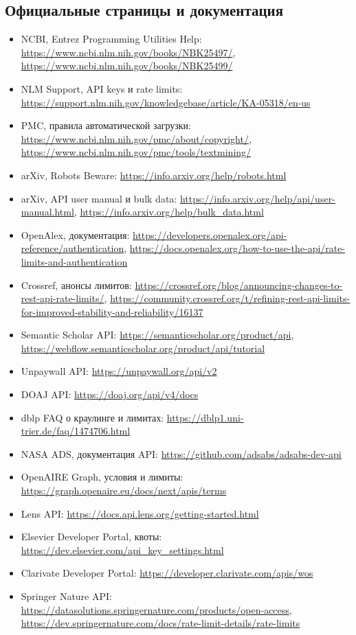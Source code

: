 \documentclass[11pt,a4paper]{article}
\begin{document}
\subsection*{Официальные страницы и документация}
\begin{itemize}[leftmargin=1.2em]
  \item NCBI, Entrez Programming Utilities Help: \url{https://www.ncbi.nlm.nih.gov/books/NBK25497/}, \url{https://www.ncbi.nlm.nih.gov/books/NBK25499/}
  \item NLM Support, API keys и rate limits: \url{https://support.nlm.nih.gov/knowledgebase/article/KA-05318/en-us}
  \item PMC, правила автоматической загрузки: \url{https://www.ncbi.nlm.nih.gov/pmc/about/copyright/}, \url{https://www.ncbi.nlm.nih.gov/pmc/tools/textmining/}
  \item arXiv, Robots Beware: \url{https://info.arxiv.org/help/robots.html}
  \item arXiv, API user manual и bulk data: \url{https://info.arxiv.org/help/api/user-manual.html}, \url{https://info.arxiv.org/help/bulk_data.html}
  \item OpenAlex, документация: \url{https://developers.openalex.org/api-reference/authentication}, \url{https://docs.openalex.org/how-to-use-the-api/rate-limits-and-authentication}
  \item Crossref, анонсы лимитов: \url{https://crossref.org/blog/announcing-changes-to-rest-api-rate-limits/}, \url{https://community.crossref.org/t/refining-rest-api-limits-for-improved-stability-and-reliability/16137}
  \item Semantic Scholar API: \url{https://semanticscholar.org/product/api}, \url{https://webflow.semanticscholar.org/product/api/tutorial}
  \item Unpaywall API: \url{https://unpaywall.org/api/v2}
  \item DOAJ API: \url{https://doaj.org/api/v4/docs}
  \item dblp FAQ о краулинге и лимитах: \url{https://dblp1.uni-trier.de/faq/1474706.html}
  \item NASA ADS, документация API: \url{https://github.com/adsabs/adsabs-dev-api}
  \item OpenAIRE Graph, условия и лимиты: \url{https://graph.openaire.eu/docs/next/apis/terms}
  \item Lens API: \url{https://docs.api.lens.org/getting-started.html}
  \item Elsevier Developer Portal, квоты: \url{https://dev.elsevier.com/api_key_settings.html}
  \item Clarivate Developer Portal: \url{https://developer.clarivate.com/apis/wos}
  \item Springer Nature API: \url{https://datasolutions.springernature.com/products/open-access}, \url{https://dev.springernature.com/docs/rate-limit-details/rate-limits}
\end{itemize}
\end{document}
